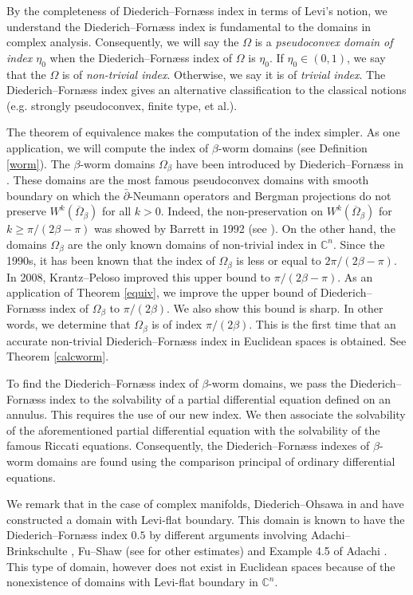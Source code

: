 \documentclass[11pt]{article}
\theoremstyle{plain} \numberwithin{equation}{section}
\theoremstyle{definition}
\begin{document}
By the completeness of Diederich--Forn\ae ss index in terms of Levi's notion, we understand the Diederich--Forn\ae ss index is fundamental to the domains in complex analysis. Consequently, we will say the $\Omega$ is a \textit{pseudoconvex domain of index $\eta_0$} when the Diederich--Forn\ae ss index of $\Omega$ is $\eta_0$. If $\eta_0\in (0,1)$, we say that the $\Omega$ is of \textit{non-trivial index}. Otherwise, we say it is of \textit{trivial index}. The Diederich--Forn\ae ss index gives an alternative classification to the classical notions (e.g. strongly pseudoconvex, finite type, et al.).

The theorem of equivalence makes the computation of the index simpler. As one application, we will compute the index of $\beta$-worm domains (see Definition \ref{worm}). The $\beta$-worm domains $\Omega_\beta$ have been introduced by Diederich--Forn\ae ss in \citep{DF77a}. These domains are the most famous pseudoconvex domains with smooth boundary on which the $\bar{\partial}$-Neumann operators and Bergman projections do not preserve $W^k(\overline{\Omega}_\beta)$ for all $k>0$. Indeed,  the non-preservation on $W^k(\overline{\Omega}_\beta)$ for $k\geq\pi/{(2\beta-\pi)}$ was showed by Barrett in 1992 (see \citep{Ba92}). On the other hand, the domains $\Omega_\beta$ are the only known domains of non-trivial index in $\mathbb{C}^n$. Since the 1990s, it has been known that the index of $\Omega_\beta$ is less or equal to $2\pi/(2\beta-\pi)$. In 2008, Krantz--Peloso \citep{KP08} improved this upper bound to $\pi/(2\beta-\pi)$. As an application of Theorem \ref{equiv}, we improve the upper bound of Diederich--Forn\ae ss index of $\Omega_\beta$ to $\pi/(2\beta)$. We also show this bound is sharp. In other words, we determine that $\Omega_\beta$ is of index $\pi/(2\beta)$. This is the first time that an accurate non-trivial Diederich--Forn\ae ss index in Euclidean spaces is obtained. See Theorem \ref{calcworm}. 

To find the Diederich--Forn\ae ss index of $\beta$-worm domains, we pass the Diederich--Forn\ae ss index to the solvability of a partial differential equation defined on an annulus. This requires the use of our new index. We then associate the solvability of the aforementioned partial differential equation with the solvability of the famous Riccati equations. Consequently, the Diederich--Forn\ae ss indexes of $\beta$-worm domains are found using the comparison principal of ordinary differential equations. 

We remark that in the case of complex manifolds, Diederich--Ohsawa in \citep{DO85} and \citep{DO07} have constructed a domain with Levi-flat boundary. This domain is known to have the Diederich--Forn\ae ss index $0.5$ by different arguments involving Adachi--Brinkschulte \citep{AB14}, Fu--Shaw \citep{FS14} (see \citep{FS14} for other estimates) and Example 4.5 of Adachi \citep{Ad15}. This type of domain, however does not exist in Euclidean spaces because of the nonexistence of domains with Levi-flat boundary in $\mathbb{C}^n$. 
\end{document}
